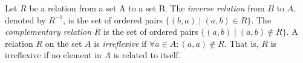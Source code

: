\documentclass[addpoints]{exam}
\newcommand\interx\cap
\begin{document}
\begin{questions}
  \begin{solution}
    \begin{parts}
    \part
    \part
    \part
    \part
    \part
    \end{parts}    
  \end{solution}

  \begin{EnvUplevel}
    Let $R$ be a relation from a set A to a set B. The \textit{inverse relation} from $B$ to $A$, denoted by $R^{-1}$, is the set of ordered pairs $\{(b, a) \mid (a, b) \in R\}$. The \textit{complementary relation} $\overline{R}$ is the set of ordered pairs $\{(a, b) \mid (a, b) \not\in R\}$. A relation $R$ on the set $A$ is \textit{irreflexive} if $\forall a \in A\colon (a, a) \not\in R$. That is, $R$ is irreflexive if no element in $A$ is related to itself.
  \end{EnvUplevel}

\question 
  \begin{parts}

\end{parts}
\end{questions}
\end{document}
